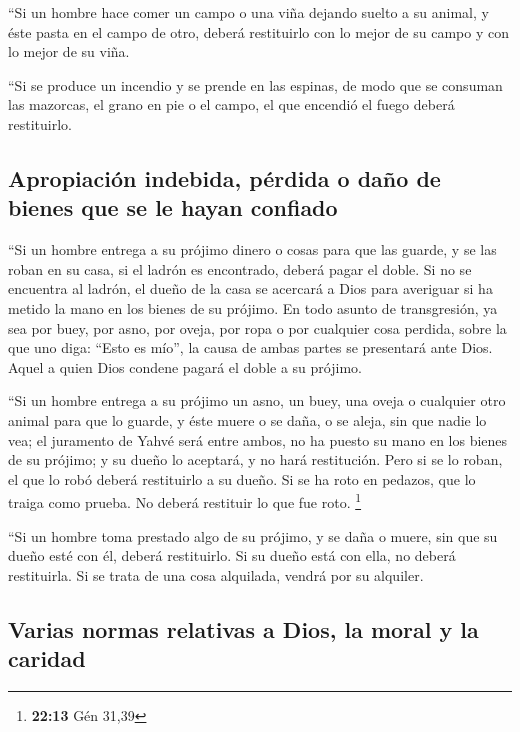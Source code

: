  ``Si un hombre hace comer un campo o una viña dejando
suelto a su animal, y éste pasta en el campo de otro, deberá restituirlo
con lo mejor de su campo y con lo mejor de su viña.

 ``Si se produce un incendio y se prende en las espinas,
de modo que se consuman las mazorcas, el grano en pie o el campo, el que
encendió el fuego deberá restituirlo.

\hypertarget{apropiaciuxf3n-indebida-puxe9rdida-o-dauxf1o-de-bienes-que-se-le-hayan-confiado}{%
\subsection{Apropiación indebida, pérdida o daño de bienes que se le
hayan
confiado}\label{apropiaciuxf3n-indebida-puxe9rdida-o-dauxf1o-de-bienes-que-se-le-hayan-confiado}}

 ``Si un hombre entrega a su prójimo dinero o cosas para
que las guarde, y se las roban en su casa, si el ladrón es encontrado,
deberá pagar el doble.  Si no se encuentra al ladrón, el
dueño de la casa se acercará a Dios para averiguar si ha metido la mano
en los bienes de su prójimo.  En todo asunto de
transgresión, ya sea por buey, por asno, por oveja, por ropa o por
cualquier cosa perdida, sobre la que uno diga: ``Esto es mío'', la causa
de ambas partes se presentará ante Dios. Aquel a quien Dios condene
pagará el doble a su prójimo.

 ``Si un hombre entrega a su prójimo un asno, un buey,
una oveja o cualquier otro animal para que lo guarde, y éste muere o se
daña, o se aleja, sin que nadie lo vea;  el juramento de
Yahvé será entre ambos, no ha puesto su mano en los bienes de su
prójimo; y su dueño lo aceptará, y no hará restitución. 
Pero si se lo roban, el que lo robó deberá restituirlo a su dueño.
 Si se ha roto en pedazos, que lo traiga como prueba. No
deberá restituir lo que fue roto. \footnote{\textbf{22:13} Gén 31,39}

 ``Si un hombre toma prestado algo de su prójimo, y se
daña o muere, sin que su dueño esté con él, deberá restituirlo.
 Si su dueño está con ella, no deberá restituirla. Si se
trata de una cosa alquilada, vendrá por su alquiler.

\hypertarget{varias-normas-relativas-a-dios-la-moral-y-la-caridad}{%
\subsection{Varias normas relativas a Dios, la moral y la
caridad}\label{varias-normas-relativas-a-dios-la-moral-y-la-caridad}}

